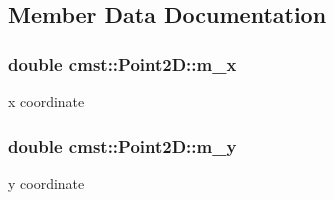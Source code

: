 \subsection{Member Data Documentation}
\subsubsection[{\texorpdfstring{m\_x}{m_x}}]{\setlength{\rightskip}{0pt plus 5cm}double cmst::Point2D::m\_x\hspace{0.3cm}{\ttfamily [private]}}\hypertarget{classcmst_1_1_point2_d_ae531b08a2a67babee5b677b4b7e79ea9}{}\label{classcmst_1_1_point2_d_ae531b08a2a67babee5b677b4b7e79ea9}


x coordinate 

\subsubsection[{\texorpdfstring{m\_y}{m_y}}]{\setlength{\rightskip}{0pt plus 5cm}double cmst::Point2D::m\_y\hspace{0.3cm}{\ttfamily [private]}}\hypertarget{classcmst_1_1_point2_d_a24414f1e4970aa89c3d7137a9e7955a5}{}\label{classcmst_1_1_point2_d_a24414f1e4970aa89c3d7137a9e7955a5}


y coordinate 

